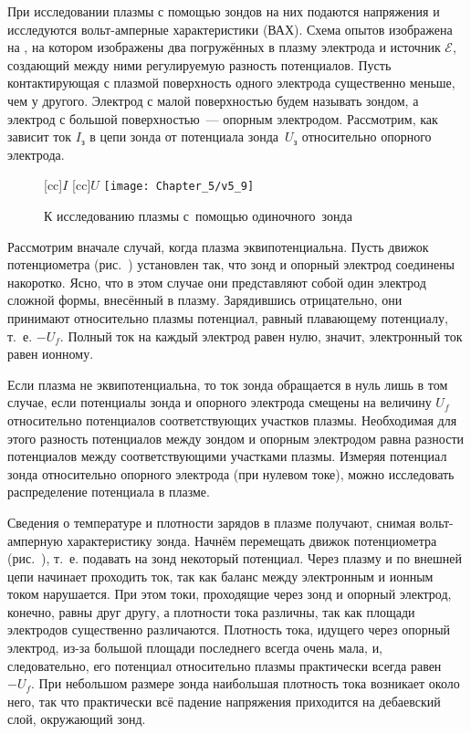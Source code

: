При исследовании плазмы с помощью зондов на них подаются напряжения и
исследуются вольт-амперные
характеристики (ВАХ). Схема опытов изображена на , на котором изображены два погружённых в плазму электрода и
источник $\mathcal{E}$, создающий между ними регулируемую разность потенциалов.
Пусть контактирующая с плазмой поверхность одного
электрода существенно меньше, чем у другого. Электрод с малой поверхностью будем
называть зондом, а электрод с большой
поверхностью~--- опорным электродом. Рассмотрим, как зависит ток $I_з$ в цепи
зонда от потенциала зонда~$U_з$
относительно опорного электрода.

\begin{figure}[h!]
	\centering
	[cc]{$I$}
	[cc]{$U$}
	\texttt{[image: Chapter\_5/v5\_9]}
	\caption{К исследованию плазмы с~помощью одиночного~зонда}
\end{figure}

Рассмотрим вначале случай, когда плазма эквипотенциальна. Пусть движок
потенциометра (рис.~) установлен так, что
зонд и
опорный электрод соединены накоротко. Ясно, что в этом случае они представляют
собой один электрод сложной формы,
внесённый в плазму.
Зарядившись отрицательно, они принимают относительно плазмы потенциал, равный
плавающему потенциалу,
т.~е. $-U_f$. Полный ток на каждый электрод равен нулю, значит, электронный ток
равен ионному.

Если плазма не эквипотенциальна, то ток зонда обращается в нуль лишь в том
случае, если потенциалы зонда и опорного
электрода смещены на величину $U_f$ относительно потенциалов соответствующих
участков плазмы. Необходимая для этого
разность потенциалов между зондом и опорным электродом равна разности
потенциалов между соответствующими участками
плазмы. Измеряя потенциал зонда относительно опорного электрода (при нулевом
токе), можно исследовать распределение
потенциала в плазме.

Сведения о температуре и плотности зарядов в плазме получают, снимая
вольт-амперную характеристику зонда. Начнём
перемещать движок потенциометра (рис.~),
т.~е. подавать на зонд некоторый потенциал. Через плазму и по внешней цепи
начинает проходить ток, так как баланс между электронным и ионным током
нарушается. При этом
токи, проходящие через зонд и опорный электрод, конечно, равны друг другу, а
плотности тока различны, так как площади
электродов существенно различаются. Плотность тока, идущего через опорный
электрод, из-за большой площади последнего
всегда очень мала, и, следовательно, его потенциал относительно плазмы
практически всегда равен $-U_f$. При небольшом
размере зонда наибольшая плотность тока возникает около него, так что
практически всё падение напряжения приходится на
дебаевский слой, окружающий зонд.

